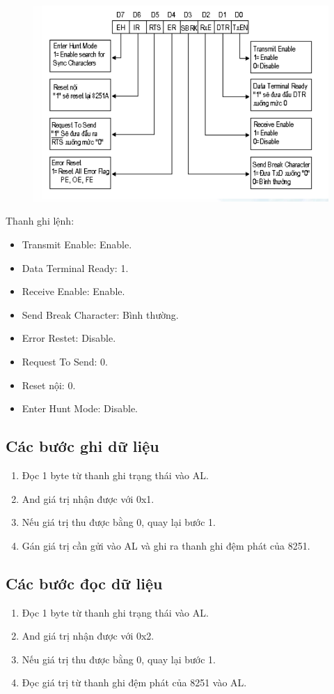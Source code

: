 \documentclass[../report.tex]{subfiles}
\begin{document}
\begin{figure}[H]
\centering
\includegraphics[width=12cm]{figures/8251-lenh.png}
\end{figure}

\noindent Thanh ghi lệnh: 
\begin{itemize}
\item Transmit Enable: Enable. 
\item Data Terminal Ready: 1. 
\item Receive Enable: Enable. 
\item Send Break Character: Bình thường. 
\item Error Restet: Disable. 
\item Request To Send: 0. 
\item Reset nội: 0. 
\item Enter Hunt Mode: Disable. 
\end{itemize}

\subsection{Các bước ghi dữ liệu}
\begin{enumerate}
    \item Đọc 1 byte từ thanh ghi trạng thái vào AL.  
    \item And giá trị nhận được với 0x1. 
    \item Nếu giá trị thu được bằng 0, quay lại bước 1. 
    \item Gán giá trị cần gửi vào AL và ghi ra thanh ghi đệm phát của 8251. 
\end{enumerate}

\subsection{Các bước đọc dữ liệu}
\begin{enumerate}
    \item Đọc 1 byte từ thanh ghi trạng thái vào AL.  
    \item And giá trị nhận được với 0x2. 
    \item Nếu giá trị thu được bằng 0, quay lại bước 1. 
    \item Đọc giá trị từ thanh ghi đệm phát của 8251 vào AL. 
\end{enumerate}
\end{document}

